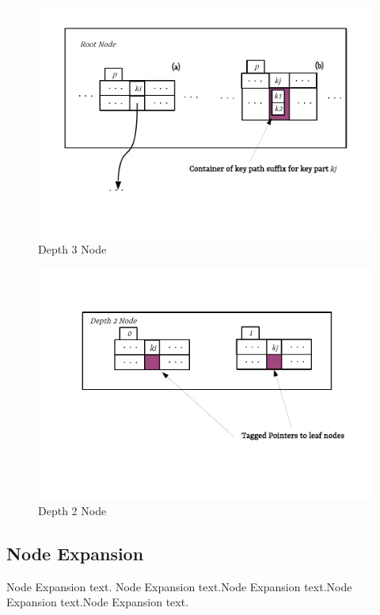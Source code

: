 \clearpage
\begin{figure}
	\centering
	\vspace{-0.3in}
	\includegraphics{figures/chapter4/depth3}
	\caption{Depth 3 Node}
	\label{fig:compressed_depth_3_node}
\end{figure}

\begin{figure}
	\centering
	\vspace{-1in}
	\includegraphics{figures/chapter4/depth2}
	\caption{Depth 2 Node}
	\label{fig:compressed_depth_2_node}
\end{figure}
\clearpage
\subsection{Node Expansion}
Node Expansion text. Node Expansion text.Node Expansion text.Node Expansion text.Node Expansion text.

